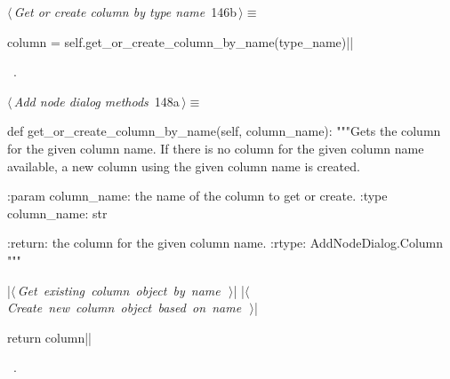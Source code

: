 \documentclass[%
    a4paper,    %
    justified,  %
    nobib,      %
    openany     %
]{tufte-book}
\begin{document}
%
\begin{flushleft} \small
\begin{minipage}{\linewidth}\label{scrap156}\raggedright\small
{} $\langle\,${\itshape Get or create column by type name}\nobreak\ {\footnotesize {146b}}$\,\rangle\equiv$
\vspace{-1ex}
\begin{pythoncode}
    column = self.get_or_create_column_by_name(type_name)|\NWsep|
\end{pythoncode}
\vspace{1.5ex}
\footnotesize
\begin{list}{}{\setlength{\itemsep}{-\parsep}\setlength{\itemindent}{-\leftmargin}}
\item \NWtxtMacroRefIn\ .

\item{}
\end{list}
\end{minipage}\vspace{4ex}
\end{flushleft}
%
\begin{flushleft} \small
\begin{minipage}{\linewidth}\label{scrap157}\raggedright\small
{} $\langle\,${\itshape Add node dialog methods}\nobreak\ {\footnotesize {148a}}$\,\rangle\equiv$
\vspace{-1ex}
\begin{pythoncode}
def get_or_create_column_by_name(self, column_name):
    """Gets the column for the given column name.
    If there is no column for the given column name available, a new column
    using the given column name is created.

    :param column_name: the name of the column to get or create.
    :type  column_name: str

    :return: the column for the given column name.
    :rtype:  AddNodeDialog.Column
    """

    |\hbox{$\langle\,${\itshape Get existing column object by name}\nobreak\ {\footnotesize {}}$\,\rangle$}|
    |\hbox{$\langle\,${\itshape Create new column object based on name}\nobreak\ {\footnotesize {}}$\,\rangle$}|

    return column|\NWsep|
\end{pythoncode}
\vspace{1.5ex}
\footnotesize
\begin{list}{}{\setlength{\itemsep}{-\parsep}\setlength{\itemindent}{-\leftmargin}}
\item \NWtxtMacroRefIn\ .

\item{}
\end{list}
\end{minipage}\vspace{4ex}
\end{flushleft}
\end{document}
